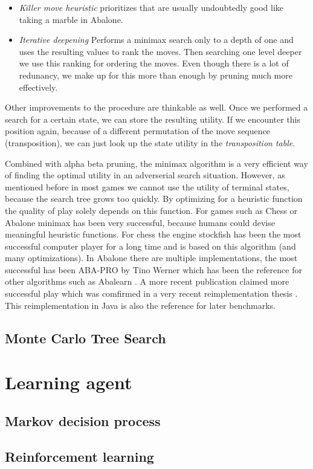 \begin{itemize}
    \item \textit{Killer move heuristic} prioritizes that are usually undoubtedly good like taking a marble in Abalone.
    \item \textit{Iterative deepening} Performs a minimax search only to a depth of one and uses the resulting values to rank the moves. Then searching one level deeper we use this ranking for ordering the moves. Even though there is a lot of redunancy, we make up for this more than enough by pruning much more effectively.
\end{itemize}

Other improvements to the procedure are thinkable as well. Once we performed a search for a certain state, we can store the resulting utility. If we encounter this position again, because of a different permutation of the move sequence (transposition), we can just look up the state utility in the \textit{transposition table}.

Combined with alpha beta pruning, the minimax algorithm is a very efficient way of finding the optimal utility in an adverserial search situation. However, as mentioned before in most games we cannot use the utility of terminal states, because the search tree grows too quickly. By optimizing for a heuristic function the quality of play solely depends on this function. For games such as Chess or Abalone minimax has been very successful, because humans could devise meaningful heuristic functions. For chess the engine stockfish has been the most successful computer player for a long time and is based on this algorithm (and many optimizations). \cite{noauthor_stockfish_2021, noauthor_stockfish_nodate} In Abalone there are multiple implementations, the most successful has been ABA-PRO by Tino Werner \cite{aichholzer_algorithmic_2002} which has been the reference for other algorithms such as Abalearn \cite{campos_abalearn_2003}. A more recent publication claimed more successful play \cite{papadopoulos_exploring_2012} which was comfirmed in a very recent reimplementation thesis \cite{verloop_critical_nodate}. This reimplementation in Java \cite{verloop_abaloneai_nodate} is also the reference for later benchmarks.

\subsection{Monte Carlo Tree Search}

\section{Learning agent}

\subsection{Markov decision process}

\subsection{Reinforcement learning}